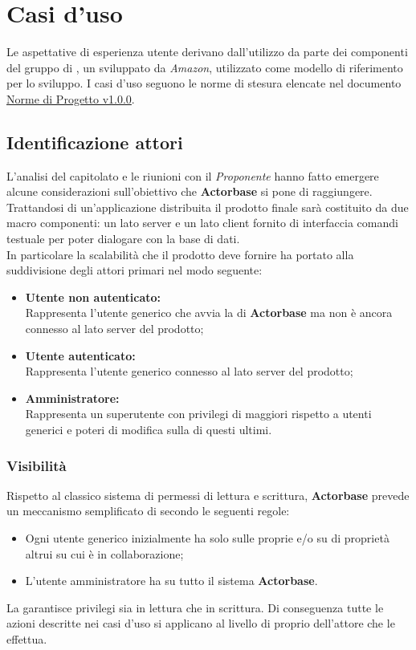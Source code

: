 \documentclass{scalatekids-article}
\begin{document}
\section{Casi d'uso}
Le aspettative di esperienza utente derivano dall'utilizzo da parte dei
componenti del gruppo di , un  
sviluppato da \textit{Amazon}, utilizzato come modello di riferimento per lo sviluppo. I casi d'uso seguono le norme di stesura elencate nel documento \href{run:../Interni/NormeDiProgetto\_v1.0.0.pdf}{Norme di Progetto v1.0.0}.
\subsection{Identificazione attori}
L'analisi del capitolato e le riunioni con il \textit{Proponente} hanno fatto emergere
alcune considerazioni sull'obiettivo che \textbf{Actorbase} si pone di raggiungere.
Trattandosi di un'applicazione distribuita il prodotto finale sarà costituito
da due macro componenti: un lato server e un lato client fornito di interfaccia
comandi testuale per poter dialogare con la base di dati.\\ In particolare la
scalabilità che il prodotto deve fornire ha portato alla suddivisione degli
attori primari nel modo seguente:\\
\begin{itemize}
\item\textbf{Utente non autenticato:}\\
  Rappresenta l'utente generico che avvia la  di \textbf{Actorbase} ma non è ancora connesso al lato server del prodotto;
\item\textbf{Utente autenticato:}\\
  Rappresenta l'utente generico connesso al lato server del prodotto;
\item\textbf{Amministratore:}\\
  Rappresenta un superutente con privilegi di  maggiori rispetto a utenti generici e poteri di modifica sulla  di questi ultimi.
\end{itemize}
\subsubsection{Visibilità}
Rispetto al classico sistema di permessi di lettura e scrittura, \textbf{Actorbase}
prevede un meccanismo semplificato di  secondo le seguenti regole:
\begin{itemize}
\item Ogni utente generico inizialmente ha  solo sulle proprie  e/o su  di proprietà altrui su cui è in collaborazione;
\item L'utente amministratore ha  su tutto il sistema \textbf{Actorbase}.
\end{itemize}
La  garantisce privilegi sia in lettura che in scrittura. Di
conseguenza tutte le azioni descritte nei casi d'uso si applicano al livello di
 proprio dell'attore che le effettua.
\end{document}
